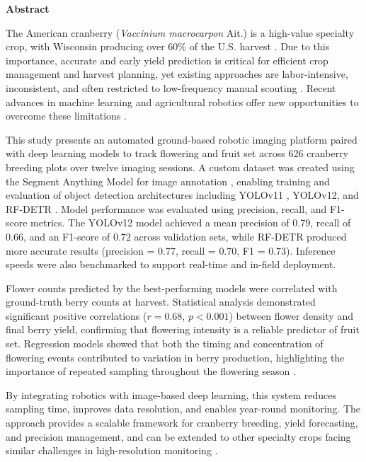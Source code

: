 \fancyhf{} %
\fancyhead[RO,R]{\thepage} %
\renewcommand{\headrulewidth}{0pt}

\begin{center}
    
    \vspace{0.9cm}
    \textbf{Abstract}
\end{center}

\doublespacing

The American cranberry (\textit{Vaccinium macrocarpon} Ait.) is a high-value specialty crop, with Wisconsin producing over 60\% of the U.S. harvest \cite{usda-nass_cranberries_2024}. Due to this importance, accurate and early yield prediction is critical for efficient crop management and harvest planning, yet existing approaches are labor-intensive, inconsistent, and often restricted to low-frequency manual scouting \cite{haufler_microwave_2022}. Recent advances in machine learning and agricultural robotics offer new opportunities to overcome these limitations \cite{ni_deep_2020,cinat_comparison_2019}.

This study presents an automated ground-based robotic imaging platform paired with deep learning models to track flowering and fruit set across 626 cranberry breeding plots over twelve imaging sessions. A custom dataset was created using the Segment Anything Model for image annotation \cite{kirillov_segment_2023}, enabling training and evaluation of object detection architectures including YOLOv11 \cite{jocher_ultralytics_2023}, YOLOv12, and RF-DETR \cite{robinson_rf-detr_2025}. Model performance was evaluated using precision, recall, and F1-score metrics. The YOLOv12 model achieved a mean precision of 0.79, recall of 0.66, and an F1-score of 0.72 across validation sets, while RF-DETR produced more accurate results (precision = 0.77, recall = 0.70, F1 = 0.73). Inference speeds were also benchmarked to support real-time and in-field deployment.

Flower counts predicted by the best-performing models were correlated with ground-truth berry counts at harvest. Statistical analysis demonstrated significant positive correlations ($r = 0.68$, $p < 0.001$) between flower density and final berry yield, confirming that flowering intensity is a reliable predictor of fruit set. Regression models showed that both the timing and concentration of flowering events contributed to variation in berry production, highlighting the importance of repeated sampling throughout the flowering season \cite{brown_fruit_2006,parent_current_2021}.

By integrating robotics with image-based deep learning, this system reduces sampling time, improves data resolution, and enables year-round monitoring. The approach provides a scalable framework for cranberry breeding, yield forecasting, and precision management, and can be extended to other specialty crops facing similar challenges in high-resolution monitoring \cite{loarca_berryportraits_2024}.
